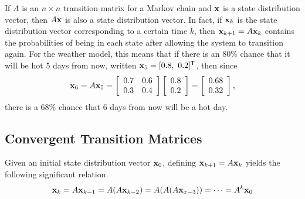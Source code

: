 If $A$ is an $n\times n$ transition matrix for a Markov chain and $\mathbf{x}$ is a state distribution vector, then $A\mathbf{x}$ is also a state distribution vector.
In fact, if $\mathbf{x}_k$ is the state distribution vector corresponding to a certain time $k$, then $\mathbf{x}_{k+1} = A\mathbf{x}_k$ contains the probabilities of being in each state after allowing the system to transition again.
For the weather model, this means that if there is an $80\%$ chance that it will be hot 5 days from now, written $\mathbf{x}_{5} = [0.8,\ 0.2]^{\mathsf T}$, then since
\[
\mathbf{x}_{6} = A\mathbf{x}_{5} =
\left[\begin{array}{cc}
0.7 & 0.6 \\
0.3 & 0.4 \\
\end{array}\right]
\left[\begin{array}{c}0.8 \\ 0.2\end{array}\right]
=
\left[\begin{array}{c}0.68 \\ 0.32\end{array}\right],
\]
there is a $68\%$ chance that 6 days from now will be a hot day.

\subsection*{Convergent Transition Matrices} %

Given an initial state distribution vector $\mathbf{x}_{0}$, defining $\mathbf{x}_{k+1} = A\mathbf{x}_k$ yields the following significant relation.
\[\mathbf{x}_k = A\mathbf{x}_{k-1} = A(A\mathbf{x}_{k-2}) = A(A(A\mathbf{x}_{x-3})) = \cdots = A^k\mathbf{x}_{0}\]

